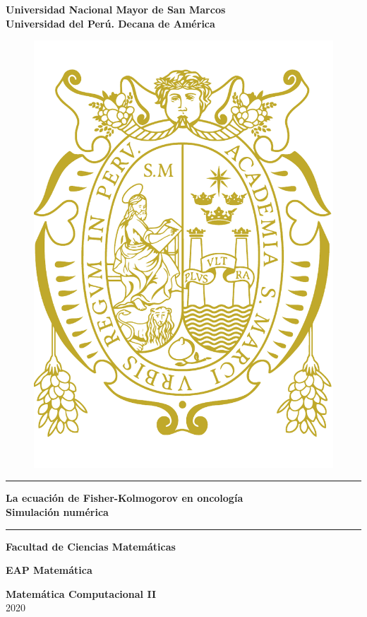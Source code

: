 \begin{titlepage}
	\begin{center}
		{\LARGE \textbf{Universidad Nacional Mayor de San Marcos}}\\
		\vspace{0.25cm}
		{\large \textbf{Universidad del Perú. Decana de América}}
		\begin{figure}[H]
			\centering
			\includegraphics[scale=0.6]{caratula/unmsm.pdf}
		\end{figure}
		\rule{150mm}{0.2mm}
		\begin{spacing}{2}
			
			{\Large \textbf{La ecuación de Fisher-Kolmogorov en oncología}}\\
			
			{\Large \textbf{Simulación numérica}}
		\end{spacing}
		\rule{150mm}{0.6mm}
		
		\vspace{2cm}
		{\LARGE \textbf{Facultad de Ciencias Matemáticas}}
		
		\vspace{5mm}
		{\Large \textbf{EAP Matemática}}
		
		\vspace{5mm}
		{\Large \textbf{Matemática Computacional II}}\\
		
		\vfill
		{\Huge 2020}
	\end{center}
\end{titlepage}

